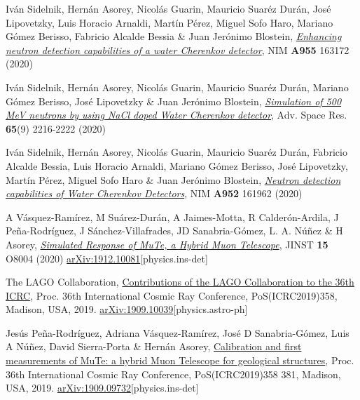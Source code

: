 \begin{etaremune}
\item {} Iván Sidelnik, Hernán Asorey, Nicolás Guarin, Mauricio Suaréz Durán, José Lipovetzky, Luis Horacio Arnaldi, Martín Pérez, Miguel Sofo Haro, Mariano Gómez Berisso, Fabricio Alcalde Bessia \& Juan Jerónimo Blostein, \href{https://doi.org/10.1016/j.nima.2019.163172}{\emph{Enhancing neutron detection capabilities of a water Cherenkov detector}}, NIM {\bf{A955}} 163172 (2020) %

\item {} Iván Sidelnik, Hernán Asorey, Nicolás Guarin, Mauricio Suaréz Durán, Mariano Gómez Berisso, José Lipovetzky \& Juan Jerónimo Blostein, \href{https://doi.org/10.1016/j.asr.2020.02.024}{\emph{Simulation of 500 MeV neutrons by using NaCl doped Water Cherenkov detector}}, Adv. Space Res. {\bf{65}}(9) 2216-2222 (2020) %

\item {} Iván Sidelnik, Hernán Asorey, Nicolás Guarin, Mauricio Suaréz Durán, Fabricio Alcalde Bessia, Luis Horacio Arnaldi, Mariano Gómez Berisso, José Lipovetzky, Martín Pérez, Miguel Sofo Haro \& Juan Jerónimo Blostein, \href{https://doi.org/10.1016/j.nima.2019.03.017}{\emph{Neutron detection capabilities of Water Cherenkov Detectors}}, NIM {\bf{A952}} 161962 (2020) %

\item {} A Vásquez-Ramírez, M Suárez-Durán, A Jaimes-Motta, R Calderón-Ardila, J Peña-Rodríguez, J Sánchez-Villafrades, JD Sanabria-Gómez, L. A. Núñez \& H Asorey, \href{https://doi.org/10.1088/1748-0221/15/08/P08004}{\emph{Simulated Response of MuTe, a Hybrid Muon Telescope}}, JINST {\bf{15}} O8004 (2020) \href{https://arxiv.org/abs/1912.10081}{arXiv:1912.10081}[physics.ins-det]

\item {} The LAGO Collaboration, \href{https://arxiv.org/abs/1909.10039}{Contributions of the LAGO Collaboration to the 36th ICRC}, \en Proc. 36th International Cosmic Ray Conference, PoS(ICRC2019)358, Madison, USA, 2019. \href{http://arxiv.org/abs/1909.10039}{arXiv:1909.10039}[physics.astro-ph]

\item {} Jesús Peña-Rodríguez, Adriana Vásquez-Ramírez, José D Sanabria-Gómez, Luis A Núñez, David Sierra-Porta \& Hernán Asorey, \href{https://pos.sissa.it/358/381/}{Calibration and first measurements of MuTe: a hybrid Muon Telescope for geological structures}, \en Proc. 36th International Cosmic Ray Conference, PoS(ICRC2019)358 381, Madison, USA, 2019. \href{http://arxiv.org/abs/1909.09732}{arXiv:1909.09732}[physics.ins-det]


\end{etaremune}
